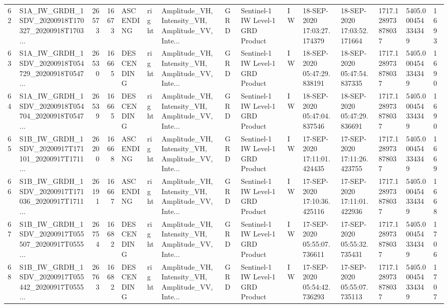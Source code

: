 \begin{tabular}{llrrlllllllllll}
62  &  S1A\_IW\_GRDH\_1SDV\_20200918T170327\_20200918T1703... &  26573 &   16673 &   ASCENDING &  right &  Amplitude\_VH, Intensity\_VH, Amplitude\_VV, Inte... &          GRD &  Sentinel-1 IW Level-1 GRD Product &              IW &  18-SEP-2020 17:03:27.174379 &  18-SEP-2020 17:03:52.171664 &          1717.128973878037 &  5405.000454334349 &       1693 \\
63  &  S1A\_IW\_GRDH\_1SDV\_20200918T054729\_20200918T0547... &  26530 &   16665 &  DESCENDING &  right &  Amplitude\_VH, Intensity\_VH, Amplitude\_VV, Inte... &          GRD &  Sentinel-1 IW Level-1 GRD Product &              IW &  18-SEP-2020 05:47:29.838191 &  18-SEP-2020 05:47:54.837335 &          1717.128973878037 &  5405.000454334349 &       1690 \\
64  &  S1A\_IW\_GRDH\_1SDV\_20200918T054704\_20200918T0547... &  26539 &   16665 &  DESCENDING &  right &  Amplitude\_VH, Intensity\_VH, Amplitude\_VV, Inte... &          GRD &  Sentinel-1 IW Level-1 GRD Product &              IW &  18-SEP-2020 05:47:04.837546 &  18-SEP-2020 05:47:29.836691 &          1717.128973878037 &  5405.000454334349 &       1690 \\
65  &  S1B\_IW\_GRDH\_1SDV\_20200917T171101\_20200917T1711... &  26200 &   16668 &   ASCENDING &  right &  Amplitude\_VH, Intensity\_VH, Amplitude\_VV, Inte... &          GRD &  Sentinel-1 IW Level-1 GRD Product &              IW &  17-SEP-2020 17:11:01.424435 &  17-SEP-2020 17:11:26.423755 &          1717.128973878037 &  5405.000454334349 &       1669 \\
66  &  S1B\_IW\_GRDH\_1SDV\_20200917T171036\_20200917T1711... &  26191 &   16667 &   ASCENDING &  right &  Amplitude\_VH, Intensity\_VH, Amplitude\_VV, Inte... &          GRD &  Sentinel-1 IW Level-1 GRD Product &              IW &  17-SEP-2020 17:10:36.425116 &  17-SEP-2020 17:11:01.422936 &          1717.128973878037 &  5405.000454334349 &       1668 \\
67  &  S1B\_IW\_GRDH\_1SDV\_20200917T055507\_20200917T0555... &  26754 &   16682 &  DESCENDING &  right &  Amplitude\_VH, Intensity\_VH, Amplitude\_VV, Inte... &          GRD &  Sentinel-1 IW Level-1 GRD Product &              IW &  17-SEP-2020 05:55:07.736611 &  17-SEP-2020 05:55:32.735431 &          1717.128973878037 &  5405.000454334349 &       1706 \\
68  &  S1B\_IW\_GRDH\_1SDV\_20200917T055442\_20200917T0555... &  26763 &   16682 &  DESCENDING &  right &  Amplitude\_VH, Intensity\_VH, Amplitude\_VV, Inte... &          GRD &  Sentinel-1 IW Level-1 GRD Product &              IW &  17-SEP-2020 05:54:42.736293 &  17-SEP-2020 05:55:07.735113 &          1717.128973878037 &  5405.000454334349 &       1707 \\

\end{tabular}
